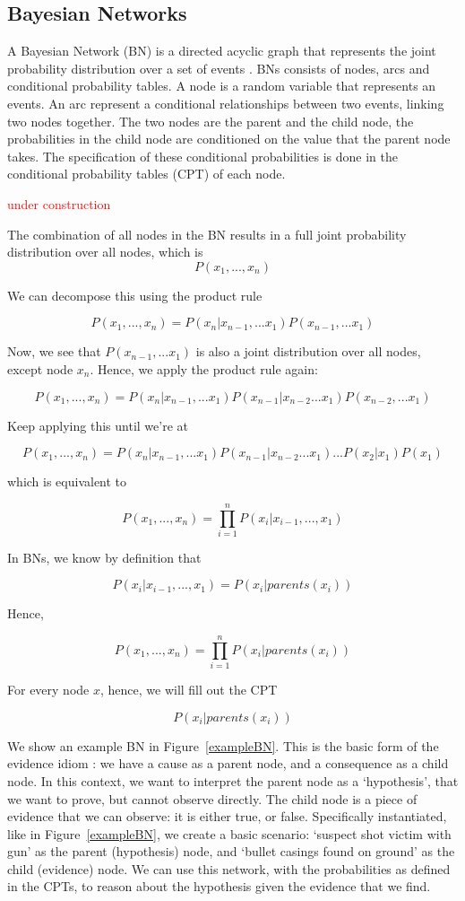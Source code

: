 \documentclass[12pt]{article}
\begin{document}
\subsection{Bayesian Networks}

A Bayesian Network (BN) is a directed acyclic graph that represents the joint probability distribution over a set of events \citep{pearl1988b}. BNs consists of nodes, arcs and conditional probability tables. A node is a random variable that represents an events. An arc represent a conditional relationships between two events, linking two nodes together. The two nodes are the parent and the child node, the probabilities in the child node are conditioned on the value that the parent node takes. The specification of these conditional probabilities is done in the conditional probability tables (CPT) of each node.

 \textcolor{red} {under construction}


The combination of all nodes in the BN results in a full joint probability distribution over all nodes, which is 
\[P(x_1, ..., x_n)\]

We can decompose this using the product rule

\[P(x_1, ..., x_n) =  P(x_n|x_{n-1},... x_1) P(x_{n-1},...x_1)\]

Now, we see that $P(x_{n-1},...x_1)$ is also a joint distribution over all nodes, except node $x_n$. Hence, we apply the product rule again:

\[P(x_1, ..., x_n) =  P(x_n|x_{n-1},... x_1) P(x_{n-1}| x_{n-2}...x_1) P(x_{n-2},...x_1)\]

Keep applying this until we're at

\[P(x_1, ..., x_n) =  P(x_n|x_{n-1},... x_1) P(x_{n-1}| x_{n-2}...x_1) ... P(x_2 | x_1)P(x_1)\]

which is equivalent to 

\[P(x_1, ..., x_n) =  \prod_{i=1}^n P(x_i | x_{i-1},..., x_1)\]

In BNs, we know by definition that  

\[ P(x_i | x_{i-1},..., x_1) = P(x_i | parents(x_i))\]

Hence,

\[P(x_1, ..., x_n) =  \prod_{i=1}^n P(x_i | parents(x_i))\]

For every node $x$, hence, we will fill out the CPT

\[P(x_i | parents(x_i))\]




We show an example BN in Figure~\ref{exampleBN}. This is the basic form of the evidence idiom \citep{Fenton2012}: we have a cause as a parent node, and a consequence as a child node. In this context, we want to interpret the parent node as a `hypothesis', that we want to prove, but cannot observe directly. The child node is a piece of evidence that we can observe: it is either true, or false. Specifically instantiated, like in Figure~\ref{exampleBN}, we create a basic scenario: `suspect shot victim with gun' as the parent (hypothesis) node, and `bullet casings found on ground' as the child (evidence) node. We can use this network, with the probabilities as defined in the CPTs, to reason about the hypothesis given the evidence that we find.
 
\end{document}
